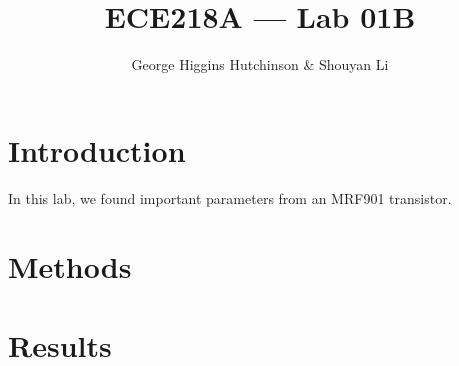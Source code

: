 \documentclass{article}
\title{ECE218A --- Lab 01B}
\author{George Higgins Hutchinson \& Shouyan Li}
\begin{document}
\maketitle

\section{Introduction}

In this lab, we found important parameters from an MRF901 transistor.

\section{Methods}

\section{Results}
\end{document}
